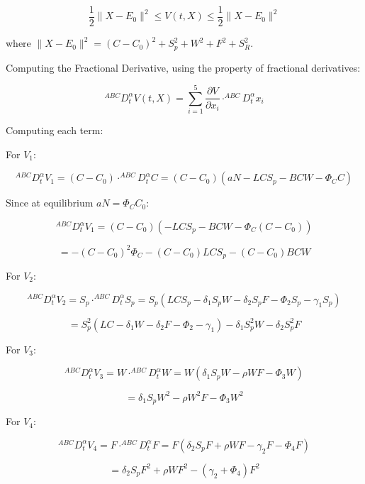 \documentclass[10pt]{NSP1}
\begin{document}
\par\medskip{}\smallskip

\[
\frac{1}{2} \parallel X - E_{0} \parallel^{2} \leq V(t,X) \leq \frac{1}{2} \parallel X - E_{0} \parallel^{2}
\]

where \(\parallel X - E_{0} \parallel^{2} = \left( C - C_{0} \right)^{2} + S_{p}^{2} + W^{2} + F^{2} + S_{R}^{2}\).

Computing the Fractional Derivative, using the property of fractional derivatives:

\[
^{ABC}D_{t}^{\alpha}V(t,X) = \sum_{i = 1}^{5}{}\frac{\partial V}{\partial x_{i}} \cdot^{ABC}D_{t}^{\alpha}x_{i}
\]

Computing each term:

For \(V_{1}\):

\[
^{ABC}D_{t}^{\alpha}V_{1} = \left( C - C_{0} \right) \cdot^{ABC}D_{t}^{\alpha}C = \left( C - C_{0} \right)\left( aN - LCS_{p} - BCW - \Phi_{C}C \right)
\]

Since at equilibrium \(aN = \Phi_{C}C_{0}\):

\[
^{ABC}D_{t}^{\alpha}V_{1} = \left( C - C_{0} \right)\left( - LCS_{p} - BCW - \Phi_{C}\left( C - C_{0} \right) \right)
\]

\[
= - \left( C - C_{0} \right)^{2}\Phi_{C} - \left( C - C_{0} \right)LCS_{p} - \left( C - C_{0} \right)BCW
\]

For \(V_{2}\):

\[
^{ABC}D_{t}^{\alpha}V_{2} = S_{p} \cdot^{ABC}D_{t}^{\alpha}S_{p} = S_{p}\left( LCS_{p} - \delta_{1}S_{p}W - \delta_{2}S_{p}F - \Phi_{2}S_{p} - \gamma_{1}S_{p} \right)
\]

\[
= S_{p}^{2}\left( LC - \delta_{1}W - \delta_{2}F - \Phi_{2} - \gamma_{1} \right) - \delta_{1}S_{p}^{2}W - \delta_{2}S_{p}^{2}F
\]

For \(V_{3}\):

\[
^{ABC}D_{t}^{\alpha}V_{3} = W \cdot^{ABC}D_{t}^{\alpha}W = W\left( \delta_{1}S_{p}W - \rho WF - \Phi_{3}W \right)
\]

\[
= \delta_{1}S_{p}W^{2} - \rho W^{2}F - \Phi_{3}W^{2}
\]

For \(V_{4}\):

\[
^{ABC}D_{t}^{\alpha}V_{4} = F \cdot^{ABC}D_{t}^{\alpha}F = F\left( \delta_{2}S_{p}F + \rho WF - \gamma_{2}F - \Phi_{4}F \right)
\]

\[
= \delta_{2}S_{p}F^{2} + \rho WF^{2} - \left( \gamma_{2} + \Phi_{4} \right)F^{2}
\]
\end{document}
